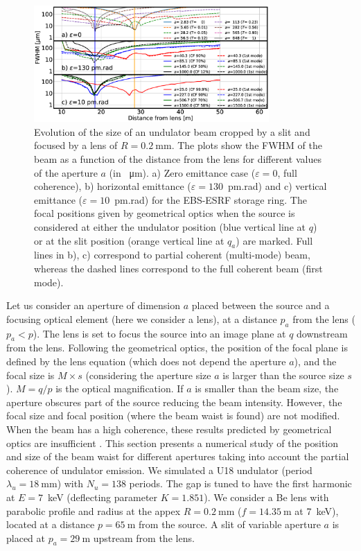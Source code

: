 \documentclass[9pt,twocolumn,twoside]{osajnl}
\begin{document}
\begin{figure}[t]
\hspace*{-1.0cm}
\centering
\includegraphics[width=0.8\textwidth]{figures/evolution.eps}
\caption{Evolution of the size of an undulator beam cropped by a slit and focused by a lens of $R=\SI{0.2}{\milli\meter}$.
The plots show the FWHM of the beam as a function of the distance from the lens for different values of the aperture $a$ (in \SI{}{\micro\meter}). 
a) Zero emittance case ($\varepsilon=0$, full coherence),
b) horizontal emittance ($\varepsilon=130$~pm.rad) and c) vertical emittance ($\varepsilon=10$~pm.rad) for the EBS-ESRF storage ring.
The focal positions given by geometrical optics when the source is considered at either the undulator position (blue vertical line at $q$) or at the slit position (orange vertical line at $q_a$) are marked.
Full lines in b), c) correspond to partial coherent (multi-mode) beam, whereas the dashed lines correspond to the full coherent beam (first mode).
}
\label{fig:oneTFund}
\end{figure}

Let us consider an aperture of dimension $a$ placed between the source and a focusing optical element (here we consider a lens), at a distance $p_a$ from the lens ($p_a < p$). The lens is set to focus the source into an image plane at $q$ downstream from the lens. Following the geometrical optics, the position of the focal plane is defined by the lens equation (which does not depend the aperture $a$), and the focal size is $M \times s$  (considering the aperture size $a$ is larger than the source size $s$). $M = q/p$ is the optical magnification. If $a$ is smaller than the beam size, the aperture obscures part of the source reducing the beam intensity. However, the focal size and focal position (where the beam waist is found) are not modified. When the beam has a high coherence, these results predicted by geometrical optics are insufficient \cite{hierarchical}. This section presents a numerical study of the position and size of the beam waist for different apertures taking into account the partial coherence of undulator emission. We simulated a U18 undulator (period $\lambda_u=\SI{18}{\milli\meter}$) with $N_u=138$ periods. The gap is tuned to have the first harmonic at $E=7$~keV (deflecting parameter $K=1.851$). We consider a Be lens with parabolic profile and radius at the appex $R=\SI{0.2}{\milli\meter}$ ($f=\SI{14.35}{\meter}$ at 7~keV), located at a distance $p=\SI{65}{\meter}$ from the source. A slit of variable aperture $a$ is placed at $p_a=\SI{29}{\meter}$ upstream from the lens. 
\end{document}
